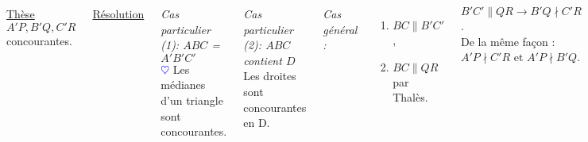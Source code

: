 \documentclass[10pt]{beamer}
\def \heart {\textcolor{blue}{$\heartsuit$} }
\begin{document}
{\begin{columns}[t]
\begin{tcolorbox}[basic]
				    \underline{Thèse} \\
				    \smallskip
				    $A'P,B'Q,C'R$ concourantes.
				    \end{tcolorbox}
		
		
		\centering
		
		\underline{Résolution}\\ \flushleft
	
		\textit{Cas particulier (1): $ABC$ = $A'B'C'$} \\ \medskip		
		\heart Les médianes d'un triangle sont concourantes.
		\bigskip
		
		\textit{Cas particulier (2): $ABC$ contient $D$} \\ \medskip
		Les droites sont concourantes en D.
		\bigskip
		
		\textit{Cas général :} \\ \medskip
		
		\begin{enumerate}
		 \item $BC\parallel B'C'$,
		 \item $BC\parallel QR$ par Thalès.
		\end{enumerate}	\bigskip
		\centering $B'C'\parallel QR \rightarrow B'Q \nmid C'R$. \\ \medskip
		De la même façon : \\ \medskip $A'P\nmid C'R\text{ et }A'P\nmid B'Q$.
	   \end{columns}
       }
	  
\end{document}
